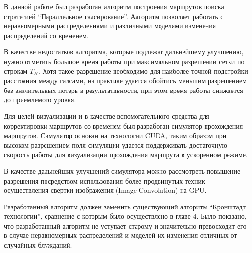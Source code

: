 \startconclusionpage

В данной работе был разработан алгоритм построения маршрутов поиска стратегией
``Параллельное галсирование''. Алгоритм позволяет работать с неравномерными
распределениями и различными моделями изменения распределений со временем.

В качестве недостатков алгоритма, которые подлежат дальнейшему улучшению,
нужно отметить большое время работы при максимальном разрешении сетки
по строкам $T_H$. Хотя такое разрешение необходимо для наиболее точной
подстройки расстояния между галсами, на практике удается
обойтись меньшим разрешением без значительных потерь в результативности, при
этом время работы снижается до приемлемого уровня.

Для целей визуализации и в качестве вспомогательного средства для корректировки
маршрутов со временем был разработан симулятор прохождения маршрутов.
Симулятор основан на технологии CUDA, таким образом при высоком разрешением
поля симуляции удается поддерживать достаточную скорость работы для
визуализации прохождения маршрута в ускоренном режиме.

В качестве дальнейших улучшений симулятора можно рассмотреть повышение
разрешения посредством использования более продвинутых техник осуществления
свертки изображения (Image Convolution) на GPU.

Разработанный алгоритм должен заменить существующий алгоритм
``Кронштадт технологии'', сравнение с которым было осуществлено
в главе 4. Было показано, что разработанный алгоритм не уступает старому и
значительно превосходит его в случае неравномерных распределений и
моделей их изменения отличных от случайных блужданий. 

\FloatBarrier
